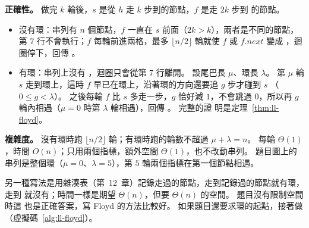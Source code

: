 \textbf{正確性。} 做完 $k$ 輪後，$s$ 是從 $h$ 走 $k$ 步到的節點，$f$ 是走 $2k$ 步到
的節點。
\begin{itemize}
\item 沒有環：串列有 $n$ 個節點，$f$ 一直在 $s$ 前面（$2k > k$），兩者是不同的節點，
第 7 行不會執行；$f$ 每輪前進兩格，最多 $\lfloor n/2 \rfloor$ 輪就使 $f$ 或
$f.\mathit{next}$ 變成 \NIL，迴圈停下，回傳 \FALSE。
\item 有環：串列上沒有 \NIL，迴圈只會從第 7 行離開。 設尾巴長 $\mu$、環長 $\lambda$。
第 $\mu$ 輪 $s$ 走到環上，這時 $f$ 早已在環上，沿著環的方向還要追 $g$ 步才碰到 $s$
（$0 \le g < \lambda$）。 之後每輪 $f$ 比 $s$ 多走一步，$g$ 恰好減 $1$，不會跳過
$0$，所以再 $g$ 輪內相遇（$\mu = 0$ 時第 $\lambda$ 輪相遇），回傳 \TRUE。 完整的證
明是定理~\ref{thm:ll-floyd}。
\end{itemize}

\textbf{複雜度。} 沒有環時跑 $\lfloor n/2 \rfloor$ 輪；有環時跑的輪數不超過
$\mu + \lambda = n$。 每輪 $\Theta(1)$，時間 $O(n)$；只用兩個指標，額外空間
$\Theta(1)$，也不改動串列。 題目圖上的串列是整個環（$\mu = 0$、$\lambda = 5$），第
$5$ 輪兩個指標在第一個節點相遇。

另一種寫法是用雜湊表（第~12~章）記錄走過的節點，走到記錄過的節點就有環，走到 \NIL
就沒有；時間一樣是期望 $\Theta(n)$，但要 $\Theta(n)$ 的空間。 題目沒有限制空間時這
也是正確答案，寫 Floyd 的方法比較好。 如果題目還要求環的起點，接著做
（虛擬碼~\ref{alg:ll-floyd}）。
